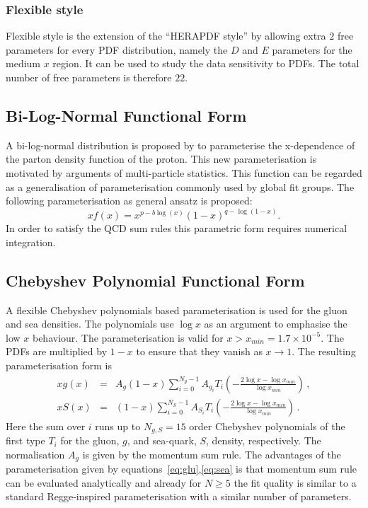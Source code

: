 \subsubsection{Flexible style}
Flexible style is the extension of the ``HERAPDF style'' by allowing  extra $2$ free parameters for every PDF distribution, namely the $D$ and $E$ parameters for the medium $x$ region. It can be used to study the data sensitivity to PDFs. The total number of free parameters is therefore $22$.

\subsection{Bi-Log-Normal Functional Form}

A bi-log-normal distribution is proposed by \cite{AndreSchoenig} to parameterise the x-dependence of the parton density function of the proton.
This new parameterisation
is motivated by arguments of multi-particle statistics. 
This function can be regarded as a generalisation of parameterisation commonly used by global fit groups.
The following parameterisation as general ansatz is proposed:
\begin{equation}
xf(x)=x^{p-b\log(x)}(1-x)^{q-\log(1-x)}.
\label{eq:AS}
\end{equation}
In order to satisfy the QCD sum rules this parametric form requires numerical integration.

\subsection{Chebyshev Polynomial Functional Form}

A flexible Chebyshev polynomials based parameterisation is used for the gluon and sea densities. The polynomials
use $\log x$ as an argument to emphasise the low $x$ behaviour. 
The parameterisation is valid for $x>x_{min} = 1.7\times 10^{-5}$. The PDFs are multiplied
by $1-x$ to ensure that they vanish as $x\to 1$. The resulting parameterisation form is 
\begin{eqnarray}
x g(x) &=& A_g \left(1-x\right) \sum_{i=0}^{N_g-1} A_{g_i} T_i \left(-\frac{\textstyle 2\log x - \log x_{min} } {\textstyle \log x_{min} } \right)\,, \label{eq:glu} \\
x S(x) &=& \left(1-x\right) \sum_{i=0}^{N_S-1} A_{S_i} T_i \left(-\frac{\textstyle 2\log x - \log x_{min} } {\textstyle \log x_{min} } \right)\,. \label{eq:sea} 
\end{eqnarray}
Here the sum over $i$ runs up to $N_{g,S}=15$ order Chebyshev polynomials of the first type $T_i$ for
the gluon, $g$, and sea-quark, $S$, density, respectively. 
The normalisation $A_g$ is given by the momentum sum rule.
The advantages of the parameterisation given by equations~\ref{eq:glu},\ref{eq:sea} is that momentum
sum rule can be evaluated analytically and  already for $N \ge 5$ the fit quality
is similar to a standard Regge-inspired parameterisation with a similar number of parameters.

